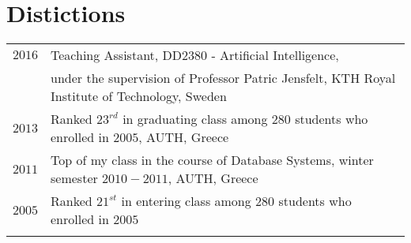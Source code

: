 \documentclass[a4paper,10pt,twoside]{article}
\begin{document}
\section{Distictions}
\begin{tabular}{rl}

  $2016$ & Teaching Assistant, DD2380 - Artificial Intelligence, \\ & under the
supervision of Professor Patric Jensfelt, KTH Royal Institute of Technology, Sweden \\


$2013$ & Ranked $23^{rd}$ in graduating class among $280$ students who enrolled in $2005$,
AUTH, Greece \\


$2011$ & Top of my class in the course of Database Systems, winter semester $2010 - 2011$,
AUTH, Greece \\


$2005$ & Ranked $21^{st}$ in entering class among $280$ students who enrolled in $2005$\\
&\\
\end{tabular}






\end{document}
